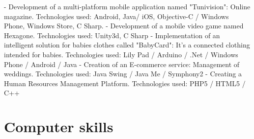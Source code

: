 \documentclass[11pt,a4paper,sans]{moderncv}        %
\begin{document}
				{- Development of a multi-platform mobile application named "Tunivision": Online magazine.
				\newline{}
				Technologies used:  Android, Java/ iOS, Objective-C / Windows Phone, Windows Store, C Sharp.
				\newline{}
					\newline{}
				- Development of a mobile video game named Hexagone.
				\newline{}
				Technologies used: Unity3d, C Sharp
				\newline{}
					\newline{}
				- Implementation of an intelligent solution for babies clothes called "BabyCard": It's a connected clothing intended for babies.
				\newline{}
				Technologies used: Lily Pad / Arduino / .Net / Windows Phone / Android / Java
				}
				{- Creation of an E-commerce service: Management of weddings.
				\newline{}
				Technologies used: Java Swing / Java Me / Symphony2
				}
				{- Creating a Human Resources Management Platform.
				\newline{}
				Technologies used: PHP5 / HTML5 / C++
					\newline{}
						\newline{}
							\newline{}
								\newline{}
									\newline{}
				}





	\section{Computer skills}
\end{document}
